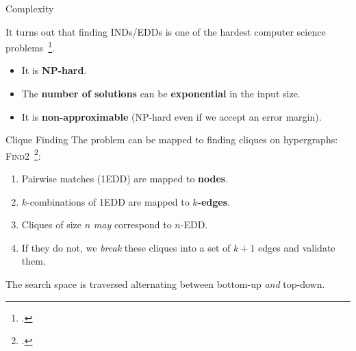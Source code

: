 \documentclass[10pt]{beamer}
\begin{document}
\begin{frame}{Complexity}

    It turns out that finding INDs/EDDs is one of the hardest computer science
    problems~\footcite{Blsius2017}.
    
    \begin{itemize}
        \item It is \textbf{NP-hard}.
        \item The \textbf{number of solutions} can be \textbf{exponential} in the input size.
        \item It is \textbf{non-approximable} (NP-hard even if we accept an error margin).
    \end{itemize}
    
    \bigskip

\end{frame}

\begin{frame}{Clique Finding}
    The problem can be mapped to finding cliques on hypergraphs: \textsc{Find2}~\footcite{koeller2003discovery}:
    
    \begin{enumerate}
        \item Pairwise matches (1EDD) are mapped to \textbf{nodes}.
        \item $k$-combinations of 1EDD are mapped to \textbf{$k$-edges}.
        \item Cliques of size $n$ \emph{may} correspond to $n$-EDD.
        \item If they do not, we \emph{break} these cliques into a set of $k+1$ edges and
            validate them.
    \end{enumerate}

    The search space is traversed alternating between bottom-up \emph{and} top-down.

\end{frame}
\end{document}
